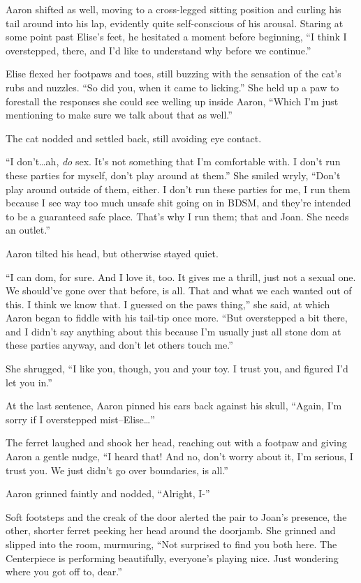 Aaron shifted as well, moving to a cross-legged sitting position and curling his tail around into his lap, evidently quite self-conscious of his arousal. Staring at some point past Elise's feet, he hesitated a moment before beginning, ``I think I overstepped, there, and I'd like to understand why before we continue.''

Elise flexed her footpaws and toes, still buzzing with the sensation of the cat's rubs and nuzzles. ``So did you, when it came to licking.'' She held up a paw to forestall the responses she could see welling up inside Aaron, ``Which I'm just mentioning to make sure we talk about that as well.''

The cat nodded and settled back, still avoiding eye contact.

``I don't\ldots{}ah, \textit{do} sex. It's not something that I'm comfortable with. I don't run these parties for myself, don't play around at them.'' She smiled wryly, ``Don't play around outside of them, either. I don't run these parties for me, I run them because I see way too much unsafe shit going on in BDSM, and they're intended to be a guaranteed safe place.  That's why I run them; that and Joan. She needs an outlet.''

Aaron tilted his head, but otherwise stayed quiet.

``I can dom, for sure. And I love it, too. It gives me a thrill, just not a sexual one. We should've gone over that before, is all. That and what we each wanted out of this. I think we know that. I guessed on the paws thing,'' she said, at which Aaron began to fiddle with his tail-tip once more. ``But overstepped a bit there, and I didn't say anything about this because I'm usually just all stone dom at these parties anyway, and don't let others touch me.''

She shrugged, ``I like you, though, you and your toy. I trust you, and figured I'd let you in.''

At the last sentence, Aaron pinned his ears back against his skull, ``Again, I'm sorry if I overstepped mist--Elise\ldots{}''

The ferret laughed and shook her head, reaching out with a footpaw and giving Aaron a gentle nudge, ``I heard that! And no, don't worry about it, I'm serious, I trust you. We just didn't go over boundaries, is all.''

Aaron grinned faintly and nodded, ``Alright, I-''

Soft footsteps and the creak of the door alerted the pair to Joan's presence, the other, shorter ferret peeking her head around the doorjamb.  She grinned and slipped into the room, murmuring, ``Not surprised to find you both here. The Centerpiece is performing beautifully, everyone's playing nice. Just wondering where you got off to, dear.''

